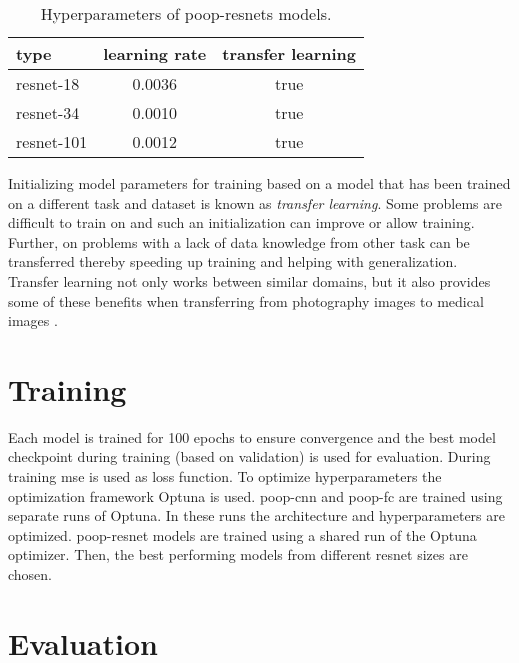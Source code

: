 \begin{table}[ht]
    \centering
    \caption{Hyperparameters of \acs{poop}-\acp{resnet} models.}
    \begin{tabular}{ l c c }
        \hline
        type & learning rate & transfer learning\\
        \hline
        \acs{resnet}-18  & 0.0036 & true \\
        \acs{resnet}-34  & 0.0010 & true \\
        \acs{resnet}-101 & 0.0012 & true \\
    \end{tabular}
    \label{tab:Methods:Models:Comparison}
\end{table}

Initializing model parameters for training based on a model that has been trained on a different task and dataset is known as \emph{transfer learning}. Some problems are difficult to train on and such an initialization can improve or allow training. Further, on problems with a lack of data knowledge from other task can be transferred thereby speeding up training and helping with generalization. Transfer learning not only works between similar domains, but it also provides some of these benefits when transferring from photography images to medical images \cite{mustafa2021supervised}.


\section{Training}
\label{sec:Methods:Training}

Each model is trained for 100 epochs to ensure convergence and the best model checkpoint during training (based on validation) is used for evaluation. During training \ac{mse} is used as loss function. To optimize hyperparameters the optimization framework Optuna \cite{optuna} is used.
\Acs{poop}-\acs{cnn} and \acs{poop}-\acs{fc} are trained using separate runs of Optuna. In these runs the architecture and hyperparameters are optimized.
\Acs{poop}-\acs{resnet} models are trained using a shared run of the Optuna optimizer. Then, the best performing models from different \acs{resnet} sizes are chosen.


\section{Evaluation}
\label{sec:Methods:Evaluation}


